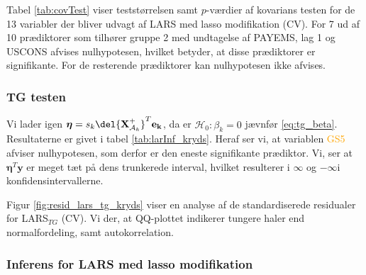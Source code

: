 

Tabel \ref{tab:covTest} viser teststørrelsen samt $p$-værdier af kovarians testen for de 13 variabler der bliver udvagt af LARS med lasso modifikation (CV). 
For 7 ud af 10 prædiktorer som tilhører gruppe 2 med undtagelse af \textcolor{blue3}{PAYEMS}, \textcolor{blue3}{lag 1} og \textcolor{blue3}{USCONS} afvises nulhypotesen, hvilket betyder, at disse prædiktorer er signifikante.
For de resterende prædiktorer kan nulhypotesen ikke afvises.

\subsubsection{TG testen}
Vi lader igen $\boldsymbol{\eta} = s_k \del{\textbf{X}^+_{\mathcal{A}_k}}^T \mathbf{e_k}$, da er $\mathcal{H}_0: \beta_k = 0$ jævnfør \ref{eq:tg_beta}. 
Resultaterne er givet i tabel \ref{tab:larInf_kryds}.
Heraf ser vi, at variablen \textcolor{orange}{GS5} afviser nulhypotesen, som derfor er den eneste signifikante prædiktor. 
Vi, ser at $\boldsymbol{\eta}^T \textbf{y}$ er meget tæt på dens trunkerede interval, hvilket resulterer i $\infty$ og $-\infty$i konfidensintervallerne.  

Figur \ref{fig:resid_lars_tg_kryds} viser en analyse af de standardiserede residualer for LARS$_{TG}$ (CV). Vi der, at QQ-plottet indikerer tungere haler end normalfordeling, samt autokorrelation. 



\subsubsection{Inferens for LARS med lasso modifikation}






